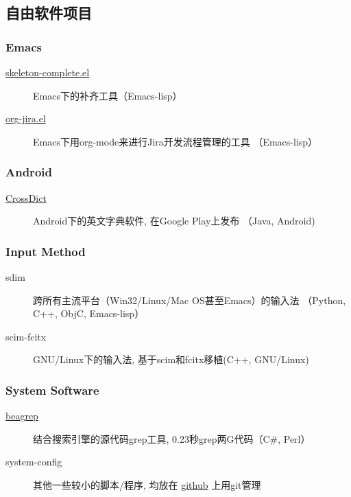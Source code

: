 \documentclass[11pt,dvipdfm,CJKbookmarks]{article}
\begin{document}
\begin{CJK*}{UTF8}{simsun}
\section{自由软件项目}
\label{sec-2}

\subsubsection{Emacs}
\label{sec-2-0-1}

\begin{description}
\item[\href{http://github.com/baohaojun/skeleton-complete}{skeleton-complete.el}] Emacs下的补齐工具（Emacs-lisp）

\item[\href{https://github.com/baohaojun/org-jira}{org-jira.el}] Emacs下用org-mode来进行Jira开发流程管理的工具
（Emacs-lisp）
\end{description}
\subsubsection{Android}
\label{sec-2-0-2}
\begin{description}
\item[\href{https://github.com/baohaojun/BTAndroidWebViewSelection}{CrossDict}] Android下的英文字典软件, 在Google Play上发布
（Java, Android)
\end{description}
\subsubsection{Input Method}
\label{sec-2-0-3}
\begin{description}
\item[sdim] 跨所有主流平台（Win32/Linux/Mac OS甚至Emacs）的输入法
（Python, C++, ObjC, Emacs-lisp）

\item[scim-fcitx] GNU/Linux下的输入法, 基于scim和fcitx移植(C++, 
GNU/Linux)
\end{description}
\subsubsection{System Software}
\label{sec-2-0-4}
\begin{description}
\item[\href{https://github.com/baohaojun/beagrep}{beagrep}] 结合搜索引擎的源代码grep工具, 0.23秒grep两G代码（C\#,
Perl）

\item[system-config] 其他一些较小的脚本/程序, 均放在 \href{https://github.com/baohaojun}{github} 上用git管理
\end{description}


\end{CJK*}
\end{document}
